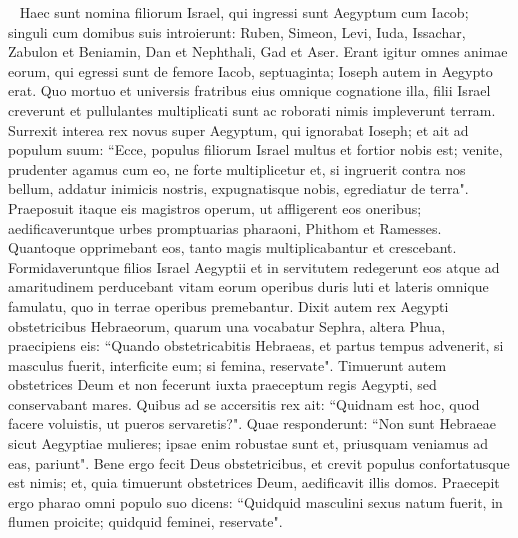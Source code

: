 
\begin{biblechapter}   
\verse Haec sunt nomina filiorum Israel, qui ingressi sunt Aegyptum cum Iacob; singuli cum domibus suis introierunt: 
\verse Ruben, Simeon, Levi, Iuda, 
\verse Issachar, Zabulon et Beniamin, 
\verse Dan et Nephthali, Gad et Aser. 
\verse Erant igitur omnes animae eorum, qui egressi sunt de femore Iacob, septuaginta; Ioseph autem in Aegypto erat. 
\verse Quo mortuo et universis fratribus eius omnique cognatione illa, 
\verse filii Israel creverunt et pullulantes multiplicati sunt ac roborati nimis impleverunt terram. 
\verse Surrexit interea rex novus super Aegyptum, qui ignorabat Ioseph; 
\verse et ait ad populum suum: “Ecce, populus filiorum Israel multus et fortior nobis est;  
\verse venite, prudenter agamus cum eo, ne forte multiplicetur et, si ingruerit contra nos bellum, addatur inimicis nostris, expugnatisque nobis, egrediatur de terra". 
\verse Praeposuit itaque eis magistros operum, ut affligerent eos oneribus; aedificaveruntque urbes promptuarias pharaoni, Phithom et Ramesses.  
\verse Quantoque opprimebant eos, tanto magis multiplicabantur et crescebant. 
\verse Formidaveruntque filios Israel Aegyptii et in servitutem redegerunt eos 
\verse atque ad amaritudinem perducebant vitam eorum operibus duris luti et lateris omnique famulatu, quo in terrae operibus premebantur. 
\verse Dixit autem rex Aegypti obstetricibus Hebraeorum, quarum una vocabatur Sephra, altera Phua, 
\verse praecipiens eis: “Quando obstetricabitis Hebraeas, et partus tempus advenerit, si masculus fuerit, interficite eum; si femina, reservate". 
\verse Timuerunt autem obstetrices Deum et non fecerunt iuxta praeceptum regis Aegypti, sed conservabant mares. 
\verse Quibus ad se accersitis rex ait: “Quidnam est hoc, quod facere voluistis, ut pueros servaretis?". 
\verse Quae responderunt: “Non sunt Hebraeae sicut Aegyptiae mulieres; ipsae enim robustae sunt et, priusquam veniamus ad eas, pariunt". 
\verse Bene ergo fecit Deus obstetricibus, et crevit populus confortatusque est nimis; 
\verse et, quia timuerunt obstetrices Deum, aedificavit illis domos. 
\verse Praecepit ergo pharao omni populo suo dicens: “Quidquid masculini sexus natum fuerit, in flumen proicite; quidquid feminei, reservate". 
\end{biblechapter}

